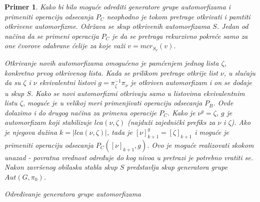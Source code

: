 \documentclass[12pt,oneside]{memoir}
\newtheorem{example}{Primer}
\theoremstyle{definition}
\begin{document}
\begin{example}
  Kako bi bilo moguće odrediti generatore grupe automorfizama i primeniti
  operaciju odsecanja $P_C$ neophodno je tokom pretrage otkrivati i pamtiti
  otkrivene automorfizme. Održava se skup otkrivenih automorfizama $S$. Jedan
  od načina da se primeni operacija $P_C$ je da se pretraga rekurzivno pokreće
  samo za one čvorove odabrane ćelije za koje važi $v = mcr_{S_\nu}(v)$.

  Otkrivanje novih automorfizama omogućeno je pamćenjem jednog lista $\zeta$,
  konkretno prvog otkrivenog lista. Kada se prilikom pretrage otkrije list
  $\nu$, u slučaju da su $\zeta$ i $\nu$ ekvivalentni listovi $g =
  \pi_\zeta^{-1} \pi_\nu$ je otkriven automorfizam i on se dodaje u skup $S$.
  Kako se novi automorfizmi otkrivaju samo u listovima ekvivalentnim listu
  $\zeta$, moguće je u velikoj meri primenjivati operaciju odsecanja $P_B$.
  Ovde dolazimo i do drugog načina za primenu operacije $P_C$. Kako je $\nu^g =
  \zeta$, $g$ je automorfizam koji stabilizuje $lca(\nu, \zeta)$ (najduži
  zajednički prefiks za $\nu$ i $\zeta$). Ako je njegova dužina $k = |lca(\nu,
  \zeta)|$, tada je $[\nu]_{k+1}^g = [\zeta]_{k+1}$ i moguće je primeniti
  operaciju odsecanja $P_C([\nu]_{k+1}, g)$. Ovo je moguće realizovati skokom
  unazad - povratna vrednost određuje do kog nivoa u pretrazi je potrebno
  vratiti se. Nakon završenog obilaska stabla skup $S$ predstavlja skup
  generatora grupe $Aut(G, \pi_0)$.

  \begin{algorithm}[H]
	  \caption{Određivanje generatora grupe automorfizama}
	  \begin{algorithmic}[1]
			\State \Return {$|\nu|$}
		  \EndIf
					\State {}
				\EndIf
			\EndIf
		  \EndFor
			\If {$\zeta = ()$}
				\State {$\zeta \gets \nu$}
			\EndIf

				\State {}
			\EndIf
		  \EndIf
		  \State \Return{$|\nu|$}
		  \EndProcedure
	  \end{algorithmic}
  \end{algorithm}


\end{example}
\end{document}
